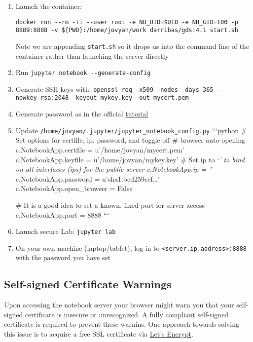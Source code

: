 \documentclass[
]{book}
\begin{document}
\begin{enumerate}
\def\labelenumi{\arabic{enumi}.}
\item
  Launch the container:

\begin{verbatim}
docker run --rm -ti --user root -e NB_UID=$UID -e NB_GID=100 -p 8889:8888 -v ${PWD}:/home/jovyan/work darribas/gds:4.1 start.sh  
\end{verbatim}

  Note we are appending \texttt{start.sh} so it drops us into
  the command line of the container rather than launching the server directly
\item
  Run \texttt{jupyter\ notebook\ -\/-generate-config}
\item
  Generate SSH keys with: \texttt{openssl\ req\ -x509\ -nodes\ -days\ 365\ -newkey\ rsa:2048\ -keyout\ mykey.key\ -out\ mycert.pem}
\item
  Generate password as in the official \href{http://jupyter-notebook.readthedocs.io/en/stable/public_server.html\#preparing-a-hashed-password}{tutorial}
\item
  Update \texttt{/home/jovyan/.jupyter/jupyter\_notebook\_config.py}
  ```python
  \# Set options for certfile, ip, password, and toggle off
  \# browser auto-opening
  c.NotebookApp.certfile = u'/home/jovyan/mycert.pem'
  c.NotebookApp.keyfile = u'/home/jovyan/mykey.key'
  \# Set ip to `\emph{' to bind on all interfaces (ips) for the public server
  c.NotebookApp.ip = '}'
  c.NotebookApp.password = u'sha1:bcd259ccf\ldots{}'
  c.NotebookApp.open\_browser = False

  \# It is a good idea to set a known, fixed port for server access
  c.NotebookApp.port = 8888
  ```
\item
  Launch secure Lab: \texttt{jupyter\ lab}
\item
  On your own machine (laptop/tablet), log in to \texttt{\textless{}server.ip.address\textgreater{}:8888} with the password you have set
\end{enumerate}

\hypertarget{self-signed-certificate-warnings}{%
\subsection{Self-signed Certificate Warnings}\label{self-signed-certificate-warnings}}

Upon accessing the notebook server your browser might warn you that your self-signed certificate is
insecure or unrecognized. A fully compliant self-signed certificate is required to prevent these warnins.
One approach towards solving this issue is to acquire a free SSL certificate via
\href{https://jupyter-notebook.readthedocs.io/en/stable/public_server.html\#using-let-s-encrypt}{Let's Encrypt}.
\end{document}

